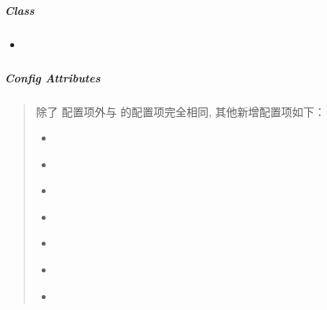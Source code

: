 \documentclass[letterpaper,10pt,english]{sphinxmanual}
\begin{document}
\subparagraph{Class}
\label{api/component/overlay/dialog:class}\begin{itemize}
\item {}
{\hyperref[api/component/overlay/dialog:Overlay.Dialog]{}}

\end{itemize}


\subparagraph{Config Attributes}
\label{api/component/overlay/dialog:config-attributes}\begin{quote}

除了 {\hyperref[api/component/overlay/overlay:Overlay.content]{}} 配置项外与 {\hyperref[api/component/overlay/popup:module-Overlay]{}} 的配置项完全相同, 其他新增配置项如下：
\begin{itemize}
\item {}
{\hyperref[api/component/overlay/dialog:Overlay.headerContent]{}}

\item {}
{\hyperref[api/component/overlay/dialog:Overlay.bodyContent]{}}

\item {}
{\hyperref[api/component/overlay/dialog:Overlay.footerContent]{}}

\item {}
{\hyperref[api/component/overlay/dialog:Overlay.closable]{}}

\item {}
{\hyperref[api/component/overlay/dialog:Overlay.draggable]{}}

\item {}
{\hyperref[api/component/overlay/dialog:Overlay.aria]{}}

\item {}
{\hyperref[api/component/overlay/dialog:Overlay.constrain]{}}

\end{itemize}
\end{quote}
\end{document}
